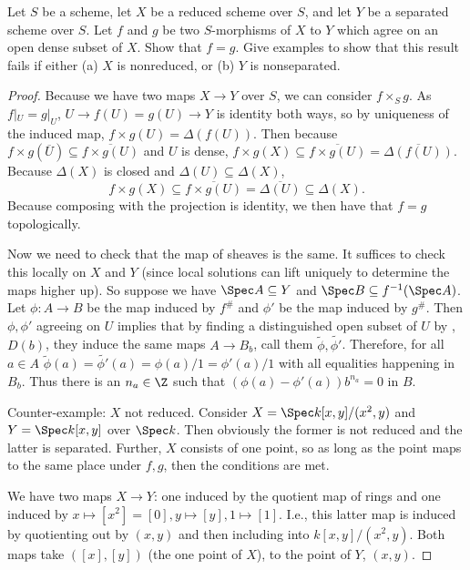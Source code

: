 \begin{exercise}
	Let $S $ be a scheme, let $X$ be a reduced scheme over $S$, and let $Y$ be a separated scheme over $S$. Let $f$ and $g $ be two $S$-morphisms of $X$ to $Y$ which agree on an open dense subset of $X$. Show that $f = g$. Give examples to show that this result fails if either (a) $X$ is nonreduced, or (b) $Y$ is nonseparated. 
	\fi
\end{exercise}
\begin{proof}
	Because we have two maps $X\to Y $ over $S $, we can consider $f \times_S g $.
	As $f|_U = g|_U $, $U \to f(U) = g(U) \to Y $ is identity both ways, so by uniqueness of the induced map, $f\times g(U) = \Delta(f(U))$.
	Then because $f\times g(\overline{U}) \subseteq \overline{f\times g(U)}   $ and $U $ is dense, $f \times g(X) \subseteq \overline{f \times g(U)}  = \overline{\Delta(f(U))}$.
	Because $\Delta(X) $ is closed and $\Delta(U) \subseteq \Delta(X) $,
	\[
		f \times g(X) \subseteq \overline{f \times g(U)}  = \overline{\Delta(U)} \subseteq \Delta(X)
	.\]
	Because composing with the projection is identity, we then have that $f=g $ topologically.

	Now we need to check that the map of sheaves is the same.
	It suffices to check this locally on $X $ and $Y $ (since local solutions can lift uniquely to determine the maps higher up).
	So suppose we have $\Spec A \subseteq Y$ and $\Spec B \subseteq f^{-1}(\Spec A) $.
	Let $\phi: A\to B $ be the map induced by $f^\# $ and $\phi ' $ be the map induced by $g^\# $.
	Then $\phi ,\phi ' $ agreeing on $U $ implies that by finding a distinguished open subset of $U $ by , $D(b) $, they induce the same maps $A \to B_{b} $, call them $\tilde{\phi },\tilde{\phi '} $.
	Therefore, for all $a\in A $ $\tilde{\phi }(a) = \tilde{\phi'}(a) = \phi (a) / 1 = \phi '(a) / 1$ with all equalities happening in $B_{b}$.
	Thus there is an $n_a \in \Z$ such that $(\phi (a) - \phi '(a)) b^{n_a} = 0 $ in $B $.

	Counter-example: $X$ not reduced.
	Consider $X = \Spec k[x,y] / (x^2,y)$ and $Y = \Spec k[x,y]$ over $\Spec k $.
	Then obviously the former is not reduced and the latter is separated.
	Further, $X $ consists of one point, so as long as the point maps to the same place under $f,g $, then the conditions are met.

	We have two maps $X\to Y $: one induced by the quotient map of rings and one induced by $x\mapsto [x^2] = [0], y \mapsto [y] , 1\mapsto [1]$.
	I.e., this latter map is induced by quotienting out by $(x,y) $ and then including into $k[x,y] / (x^2,y) $.
	Both maps take $([x],[y]) $ (the one point of $X $), to the point of $Y $, $(x,y) $.
\end{proof}

